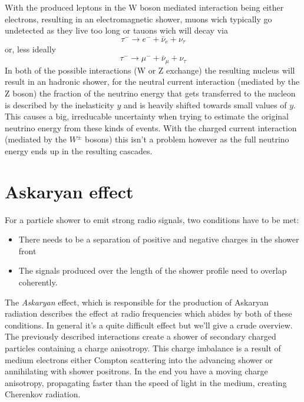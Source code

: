 \documentclass[11pt,a4paper,faculty=we,language=en,doctype=report]{cls/ugent-doc}
\begin{document}
With the produced leptons in the W boson mediated interaction being either electrons,
resulting in an electromagnetic shower, muons wich typically go undetected as they live
too long or
tauons wich will decay via
\begin{equation}
	\tau^- \rightarrow e^- + \bar{\nu}_e + \nu_\tau
\end{equation}
or, less ideally
\begin{equation}
	\tau^- \rightarrow \mu^- + \bar{\nu}_\mu + \nu_\tau
\end{equation}
In both of the possible interactions (W or Z exchange) the resulting nucleus
will result in an hadronic shower, for the neutral current interaction (mediated
by the Z boson) the fraction of the neutrino energy that gets transferred to
the nucleon is described by the inelasticity $y$ and is heavily shifted towards
small values of $y$\cite{elasticity_y}. This causes a big, irreducable
uncertainty when trying to estimate the original neutrino energy from these
kinds of events.  With the charged current interaction (mediated by the $W^\pm$
bosons) this isn't a problem however as the full neutrino energy ends up in the
resulting cascades.
\section{Askaryan effect}
\label{sec:Askaryan}
For a particle shower to emit strong radio signals, two conditions have to be met:
\begin{itemize}
	\item There needs to be a separation of positive and negative charges in the shower front 
	\item The signals produced over the length of the shower profile need to overlap coherently.
\end{itemize}
The \textit{Askaryan} \cite{Askaryan} effect, which is responsible for the
production of Askaryan radiation describes the effect at radio frequencies
which abides by both of these conditions. 
In general it's a quite difficult effect but we'll give a crude overview.  The previously described interactions
create a shower of secondary charged particles containing a charge anisotropy.
This charge imbalance is a result of medium electrons either Compton scattering
into the advancing shower or annihilating with shower positrons.  In the end
you have a moving charge anisotropy, propagating faster than the speed of light
in the medium, creating Cherenkov radiation.  
\end{document}
